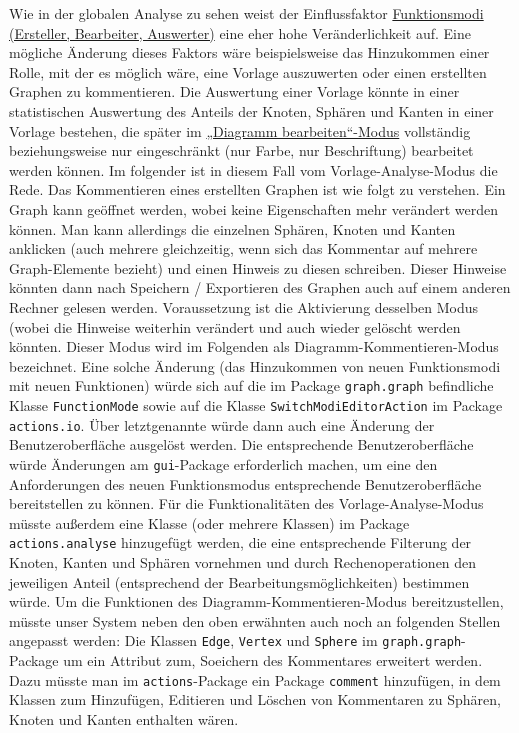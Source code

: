 \documentclass[enabledeprecatedfontcommands,fontsize=11pt,paper=a4,twoside]{scrartcl}
\newcounter{one}
\begin{document}
Wie in der globalen Analyse zu sehen weist der Einflussfaktor \hyperlink{z}{Funktionsmodi (Ersteller, Bearbeiter, Auswerter)} eine eher hohe Veränderlichkeit auf. Eine mögliche Änderung dieses Faktors wäre beispielsweise das Hinzukommen einer Rolle, mit der es möglich wäre, eine Vorlage auszuwerten oder einen erstellten Graphen zu kommentieren.
Die Auswertung einer Vorlage könnte in einer statistischen Auswertung des Anteils der Knoten, Sphären und Kanten in einer Vorlage bestehen, die später im \hyperlink{„Diagramm bearbeiten“-Modus}{„Diagramm bearbeiten“-Modus} vollständig beziehungsweise nur eingeschränkt (nur Farbe, nur Beschriftung) bearbeitet werden können. Im folgender ist in diesem Fall vom Vorlage-Analyse-Modus die Rede.
Das Kommentieren eines erstellten Graphen ist wie folgt zu verstehen. Ein Graph kann geöffnet werden, wobei keine Eigenschaften mehr verändert werden können. Man kann allerdings die einzelnen Sphären, Knoten und Kanten anklicken (auch mehrere gleichzeitig, wenn sich das Kommentar auf mehrere Graph-Elemente bezieht) und einen Hinweis zu diesen schreiben. Dieser Hinweise könnten dann nach Speichern / Exportieren des Graphen auch auf einem anderen Rechner gelesen werden. Voraussetzung ist die Aktivierung desselben Modus (wobei die Hinweise weiterhin verändert und auch wieder gelöscht werden könnten. Dieser Modus wird im Folgenden als Diagramm-Kommentieren-Modus bezeichnet.
Eine solche Änderung (das Hinzukommen von neuen Funktionsmodi mit neuen Funktionen) würde sich auf die im Package \texttt{graph.graph} befindliche Klasse \texttt{FunctionMode} sowie auf die Klasse \texttt{SwitchModiEditorAction} im Package \texttt{actions.io}. Über letztgenannte würde dann auch eine Änderung der Benutzeroberfläche ausgelöst werden. Die entsprechende Benutzeroberfläche würde Änderungen am \texttt{gui}-Package erforderlich machen, um eine den Anforderungen des neuen Funktionsmodus entsprechende Benutzeroberfläche bereitstellen zu können.
Für die Funktionalitäten des Vorlage-Analyse-Modus müsste außerdem eine Klasse (oder mehrere Klassen) im Package \texttt{actions.analyse} hinzugefügt werden, die eine entsprechende Filterung der Knoten, Kanten und Sphären vornehmen und durch Rechenoperationen den jeweiligen Anteil (entsprechend der Bearbeitungsmöglichkeiten) bestimmen würde.
Um die Funktionen des Diagramm-Kommentieren-Modus bereitzustellen, müsste unser System neben den oben erwähnten auch noch an folgenden Stellen angepasst werden: Die Klassen \texttt{Edge}, \texttt{Vertex} und \texttt{Sphere} im \texttt{graph.graph}-Package um ein Attribut zum, Soeichern des Kommentares erweitert werden. Dazu müsste man im \texttt{actions}-Package ein Package \texttt{comment} hinzufügen, in dem Klassen zum Hinzufügen, Editieren und Löschen von Kommentaren zu Sphären, Knoten und Kanten enthalten wären. \\
 
\end{document}
